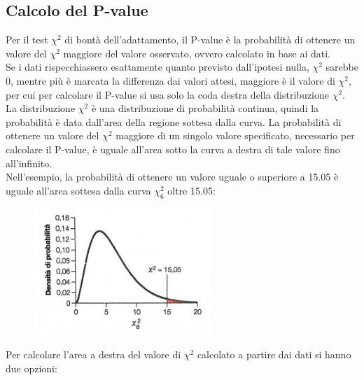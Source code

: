 \documentclass[10pt, draft]{book}
\begin{document}
\subsection{Calcolo del P-value}
Per il test $\chi^2$ di bontà dell'adattamento, il P-value è la probabilità di ottenere un valore del $\chi^2$ maggiore del valore osservato, ovvero calcolato in base ai dati.
\\
Se i dati rispecchiassero esattamente quanto previsto dall'ipotesi nulla, $\chi^2$ sarebbe 0, mentre più è marcata la differenza dai valori attesi, maggiore è il valore di $\chi^2$, per cui per calcolare il P-value si usa solo la coda destra della distribuzione $\chi^2$.
\\
La distribuzione $\chi^2$ è una distribuzione di probabilità continua, quindi la probabilità è data dall'area della regione sottesa dalla curva. La probabilità di ottenere un valore del $\chi^2$ maggiore di un singolo valore specificato, necessario per calcolare il P-value, è uguale all'area sotto la curva a destra di tale valore fino all'infinito.
\\
Nell'esempio, la probabilità di ottenere un valore uguale o superiore a 15.05 è uguale all'area sottesa dalla curva $\chi^2_6$ oltre 15.05:
\clearpage
    \begin{figure}[h]\label{fig8.2-2}
    \centering
    \includegraphics[width=0.6\textwidth]{fig8.2-2}
    \caption{\small{}}
    \end{figure}
Per calcolare l'area a destra del valore di $\chi^2$ calcolato a partire dai dati si hanno due opzioni:
\end{document}
